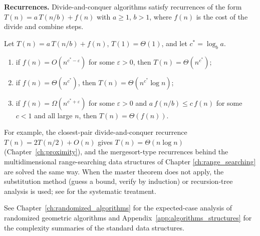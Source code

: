 \medskip
\noindent\textbf{Recurrences.}
Divide-and-conquer algorithms satisfy recurrences of the form
$T(n) = a\,T(n/b) + f(n)$ with $a \ge 1$, $b > 1$, where $f(n)$ is the cost
of the divide and combine steps.

\begin{theorem}\label{thm:appmath_master}
  Let $T(n) = a\,T(n/b) + f(n)$, $T(1) = \Theta(1)$, and let
  $c^* = \log_b a$.
  \begin{enumerate}
    \item if $f(n) = O(n^{c^* - \varepsilon})$ for some $\varepsilon > 0$,
      then $T(n) = \Theta(n^{c^*})$;
    \item if $f(n) = \Theta(n^{c^*})$, then $T(n) = \Theta(n^{c^*} \log n)$;
    \item if $f(n) = \Omega(n^{c^* + \varepsilon})$ for some $\varepsilon > 0$
      and $a\,f(n/b) \le c\,f(n)$ for some $c < 1$ and all large $n$, then
      $T(n) = \Theta(f(n))$.
  \end{enumerate}
\end{theorem}

For example, the closest-pair divide-and-conquer recurrence
$T(n) = 2T(n/2) + O(n)$ gives $T(n) = \Theta(n \log n)$
(Chapter~\ref{ch:proximity}), and the mergesort-type recurrences behind the
multidimensional range-searching data structures of Chapter
\ref{ch:range_searching} are solved the same way. When the master theorem
does not apply, the substitution method (guess a bound, verify by induction)
or recursion-tree analysis is used; see \cite{cormen2009} for the systematic
treatment.

See Chapter~\ref{ch:randomized_algorithms} for the expected-case analysis of
randomized geometric algorithms and Appendix~\ref{app:algorithms_structures}
for the complexity summaries of the standard data structures.
